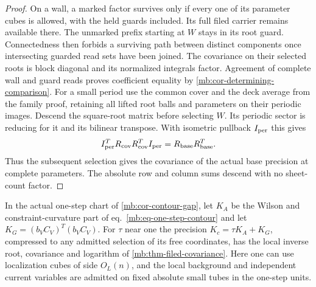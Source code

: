 \documentclass[11pt,letterpaper,reqno]{amsart}
\makeatletter
\numberwithin{equation}{section}
\renewcommand{\eqref}[1]{\textup{eq.~\ref{#1}}}
\theoremstyle{definition}
\newcommand{\ms@majorstart}{%
  \pushQED{\qed}\renewcommand{\qedsymbol}{$\blacksquare\square$}}
\newenvironment{corollary}[1][]{\ms@majorstart\ms@corollary[#1]}
  {\popQED\endms@corollary}
\theoremstyle{remark}
\makeatother
\begin{document}
\begin{proof}
On a wall, a marked factor survives only if every one of its parameter cubes is allowed, with the held guards included. Its full filed carrier remains available there. The unmarked prefix starting at \(W\) stays in its root guard. Connectedness then forbids a surviving path between distinct components once intersecting guarded read sets have been joined. The covariance on their selected roots is block diagonal and its normalized integrals factor. Agreement of complete wall and guard reads proves coefficient equality by \cref{mb:cor-determining-comparison}. For a small period use the common cover and the deck average from the family proof, retaining all lifted root balls and parameters on their periodic images. Descend the square-root matrix before selecting \(W\). Its periodic sector is reducing for it and its bilinear transpose. With isometric pullback \(I_{\rm per}\) this gives
\[
 I_{\rm per}^T R_{\rm cov} R_{\rm cov}^T I_{\rm per}
                       =R_{\rm base}R_{\rm base}^T .
\]
Thus the subsequent selection gives the covariance of the actual base precision at complete parameters. The absolute row and column sums descend with no sheet-count factor.
\end{proof}

\begin{corollary}[The finite-range first-step precision]
\label{mb:cor-first-step-local-gaussian}
In the actual one-step chart of \cref{mb:cor-contour-gap}, let \(K_A\) be the Wilson and constraint-curvature part of \eqref{mb:eq-one-step-contour} and let \(K_G=(b_VC_V)^T(b_VC_V)\). For \(\tau\) near one the precision \(K_c=\tau K_A+K_G\), compressed to any admitted selection of its free coordinates, has the local inverse root, covariance and logarithm of \cref{mb:thm-filed-covariance}. Here one can use localization cubes of side \(O_L(n)\), and the local background and independent current variables are admitted on fixed absolute small tubes in the one-step units.
\end{corollary}
\end{document}
